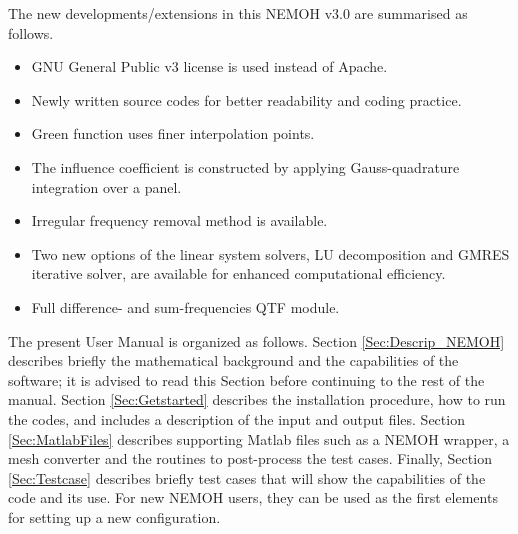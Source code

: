 \documentclass[12pt,a4paper,titlepage]{article}
\begin{document}
\noindent
The new developments/extensions in this NEMOH v3.0 are summarised as follows.
\begin{itemize}
    \item GNU General Public v3 license is used instead of Apache.
    \item Newly written source codes for better readability and coding practice.
    \item Green function uses finer interpolation points.
    \item The influence coefficient is constructed by applying Gauss-quadrature integration over a panel.
    \item Irregular frequency removal method is available.
    \item Two new options of the linear system solvers, LU decomposition and GMRES iterative solver, are available for enhanced computational efficiency.
    \item Full difference- and sum-frequencies QTF module.\\
\end{itemize}

The present User Manual is organized as follows. Section \ref{Sec:Descrip_NEMOH} describes briefly the mathematical background and the capabilities of the software; it is advised to read this Section before continuing to the rest of the manual. Section \ref{Sec:Getstarted} describes the installation procedure, how to run the codes, and includes a description of the input and output files. Section \ref{Sec:MatlabFiles} describes supporting Matlab files such as a NEMOH wrapper, a mesh converter and the routines to post-process the test cases. Finally, Section \ref{Sec:Testcase} describes briefly test cases that will show the capabilities of the code and its use. For new NEMOH users, they can be used as the first elements for setting up a new configuration.
\newline

\vspace*{0.1cm}
\end{document}
